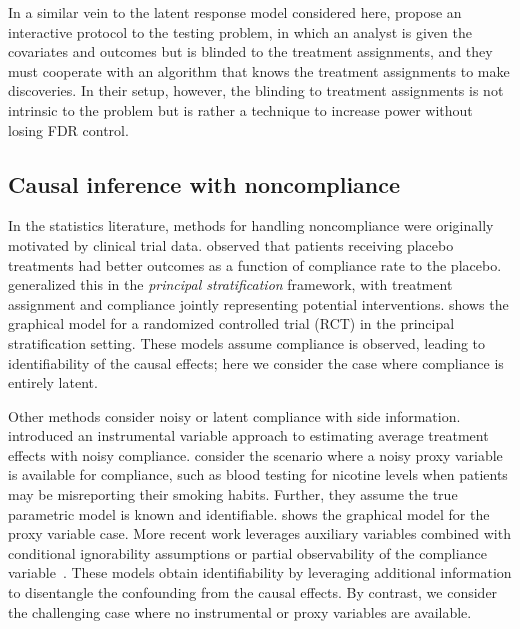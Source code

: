 In a similar vein to the latent response model considered here, \citet{duan:etal:2024:interactive-fdr-control} propose an interactive protocol to the testing problem, in which an analyst is given the covariates and outcomes but is blinded to the treatment assignments, and they must cooperate with an algorithm that knows the treatment assignments to make discoveries. In their setup, however, the blinding to treatment assignments is not intrinsic to the problem but is rather a technique to increase power without losing FDR control.

\subsection{Causal inference with noncompliance}
\label{subsec:background:compliance}
In the statistics literature, methods for handling noncompliance were originally motivated by clinical trial data. \citet{efron:feldman:1991:compliance} observed that patients receiving placebo treatments had better outcomes as a function of compliance rate to the placebo. \citet{frangakis:rubin:2002:principal-stratification} generalized this in the \textit{principal stratification} framework, with treatment assignment and compliance jointly representing potential interventions.  shows the graphical model for a randomized controlled trial (RCT) in the principal stratification setting. 
These models assume compliance is observed, leading to identifiability of the causal effects; here we consider the case where compliance is entirely latent.

Other methods consider noisy or latent compliance with side information. \citet{angrist:etal:1996:iv-noncompliance} introduced an instrumental variable approach to estimating average treatment effects with noisy compliance. \citet{boatman:etal:2017:compliance-error} consider the scenario where a noisy proxy variable is available for compliance, such as blood testing for nicotine levels when patients may be misreporting their smoking habits. Further, they assume the true parametric model is known and identifiable.  shows the graphical model for the proxy variable case. More recent work leverages auxiliary variables combined with conditional ignorability assumptions or partial observability of the compliance variable~\citep{jiang:ding:2021:identification-principal-strata-auxiliary,jiang:etal:2022:multiply-robust-principal-ignorability,lu:etal:2023:principal-strata-continuous}.  These models obtain identifiability by leveraging additional information to disentangle the confounding from the causal effects. By contrast, we consider the challenging case where no instrumental or proxy variables are available.


